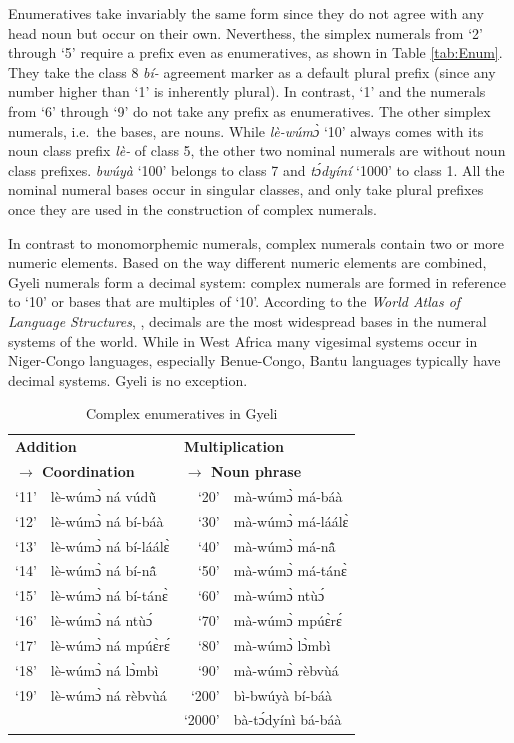 \noindent Enumeratives take invariably the same form since they do not agree with any head noun but occur on their own. Neverthess, the simplex numerals from `2' through `5' require a prefix even as enumeratives, as shown in Table \ref{tab:Enum}. They take the class 8 {\itshape bí-} agreement marker as a default plural prefix (since any number higher than `1' is inherently plural). In contrast, `1' and the numerals from `6' through `9' do not take any prefix as enumeratives. The other simplex numerals, i.e.~the bases, are nouns. While {\itshape lè-wúmɔ̀} `10' always comes with its noun class prefix {\itshape lè-} of class 5, the other two nominal numerals are without noun class prefixes. {\itshape bwúyà} `100' belongs to class 7 and {\itshape tɔ́dyíní} `1000' to class 1. All the nominal numeral bases occur in singular classes, and only take plural prefixes once they are used in the construction of complex numerals.

In contrast to monomorphemic numerals, complex numerals contain two or more numeric elements. Based on the way different numeric elements are combined, Gyeli numerals form a decimal system: complex numerals are formed in reference to `10' or bases that are multiples of `10'. According to the {\itshape World Atlas of Language Structures}, \citet[map 131]{comrie05}, decimals are the most widespread bases in the numeral systems of the world. While in West Africa many vigesimal systems occur in Niger-Congo languages, especially Benue-Congo, Bantu languages typically have decimal systems. Gyeli is no exception.

\begin{table} 
\centering
\begin{tabular}{rp{4cm}|rp{4cm}}
 \midrule
 \multicolumn{2}{l|}{\bfseries Addition} & \multicolumn{2}{l}{\bfseries Multiplication} \\
 \multicolumn{2}{l|}{\bfseries $\rightarrow$ Coordination} & \multicolumn{2}{l}{\bfseries $\rightarrow$ Noun phrase}  \\
  \midrule
 `11' & lè-wúmɔ̀ ná vúdũ̀ & `20' & mà-wúmɔ̀ má-báà \\
 `12' & lè-wúmɔ̀ ná bí-báà & `30' & mà-wúmɔ̀ má-láálɛ̀ \\
 `13' & lè-wúmɔ̀ ná bí-láálɛ̀ & `40' & mà-wúmɔ̀ má-nã̂ \\
 `14' & lè-wúmɔ̀ ná bí-nã̂ & `50' & mà-wúmɔ̀ má-tánɛ̀ \\
 `15' & lè-wúmɔ̀ ná bí-tánɛ̀ & `60' & mà-wúmɔ̀ ntùɔ́ \\
 `16' & lè-wúmɔ̀ ná ntùɔ́ & `70' & mà-wúmɔ̀ mpúɛ̀rɛ́  \\
 `17' & lè-wúmɔ̀ ná mpúɛ̀rɛ́ & `80' & mà-wúmɔ̀ lɔ̀mbì \\
 `18' & lè-wúmɔ̀ ná lɔ̀mbì & `90' & mà-wúmɔ̀ rèbvùá \\
 `19' & lè-wúmɔ̀ ná rèbvùá & `200' & bì-bwúyà bí-báà \\
  & & `2000' & bà-tɔ́dyínì bá-báà \\
  \midrule
\end{tabular}
\caption{Complex enumeratives in Gyeli}
\label{Tab:CompNum}
\end{table}

